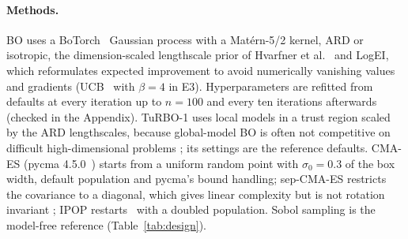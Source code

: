 \documentclass[10pt,a4paper,twocolumn]{article}
\begin{document}
\paragraph{Methods.}
BO uses a BoTorch~\citep{balandat2020botorch} Gaussian process with a Mat\'ern-5/2 kernel, ARD or isotropic, the dimension-scaled lengthscale prior
of Hvarfner et al.~\citep{hvarfner2024vanilla} and LogEI, which reformulates expected improvement to avoid numerically
vanishing values and gradients \citep{ament2023logei} (UCB~\citep{srinivas2010gpucb} with $\beta=4$ in E3). Hyperparameters are refitted from
defaults at every iteration up to $n=100$ and every ten iterations afterwards (checked in the Appendix). TuRBO-1 uses
local models in a trust region scaled by the ARD lengthscales, because global-model BO is often not competitive on
difficult high-dimensional problems \citep{eriksson2019turbo}; its settings are the reference defaults. CMA-ES (pycma 4.5.0~\citep{hansen2019pycma})
starts from a uniform random point with $\sigma_0=0.3$ of the box width, default population and pycma's bound handling;
sep-CMA-ES restricts the covariance to a diagonal, which gives linear complexity but is not rotation invariant
\citep{ros2008sepcma}; IPOP restarts~\citep{auger2005ipop} with a doubled population. Sobol sampling is the model-free reference
(Table~\ref{tab:design}).
\end{document}
